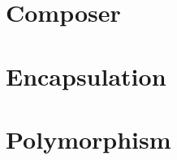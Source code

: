 \documentclass[b5paper,openany]{book}
\begin{document}
\chapter{Composer}




\chapter{Encapsulation}


\chapter{Polymorphism}








\end{document}
